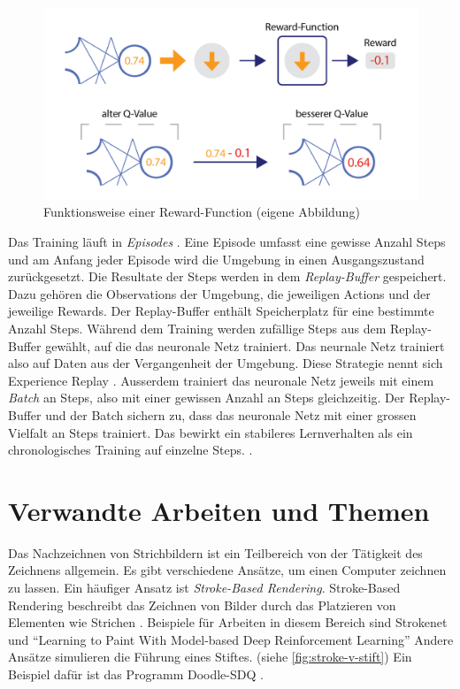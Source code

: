 \begin{figure}[!ht]
    \centering
    \includegraphics[width=\textwidth]{images/theorie/reinforce-2.png}
    \caption{Funktionsweise einer Reward-Function (eigene Abbildung)}
    \label{fig:reinforce-2}
\end{figure}

Das Training läuft in \emph{Episodes} \cite[S. 14]{sutton_reinforcement_2014}.
Eine Episode umfasst eine gewisse Anzahl Steps und am Anfang jeder Episode wird
die Umgebung in einen Ausgangszustand zurückgesetzt. Die Resultate der Steps
werden in dem \emph{Replay-Buffer} gespeichert. Dazu gehören die Observations
der Umgebung, die jeweiligen Actions und der jeweilige Rewards. Der
Replay-Buffer enthält Speicherplatz für eine bestimmte Anzahl Steps. Während dem
Training werden zufällige Steps aus dem Replay-Buffer gewählt, auf die das
neuronale Netz trainiert. Das neurnale Netz trainiert also auf Daten aus der
Vergangenheit der Umgebung. Diese Strategie nennt sich Experience Replay
\cite[S. 5]{mnih_playing_2013}. Ausserdem trainiert das neuronale Netz jeweils
mit einem \emph{Batch} an Steps, also mit einer gewissen Anzahl an Steps
gleichzeitig. Der Replay-Buffer und der Batch sichern zu, dass das neuronale
Netz mit einer grossen Vielfalt an Steps trainiert. Das bewirkt ein stabileres
Lernverhalten als ein chronologisches Training auf einzelne Steps.
\cite{phd_how_2021}.


\section{Verwandte Arbeiten und Themen}\label{chap:t_ver} Das Nachzeichnen von
Strichbildern ist ein Teilbereich von der Tätigkeit des Zeichnens allgemein. Es
gibt verschiedene Ansätze, um einen Computer zeichnen zu lassen. Ein häufiger
Ansatz ist \emph{Stroke-Based Rendering}. Stroke-Based Rendering beschreibt das
Zeichnen von Bilder durch das Platzieren von Elementen wie Strichen
\cite{hertzmann_stroke_2002}. Beispiele für Arbeiten in diesem Bereich sind
Strokenet \cite{zheng2018strokenet} und ``Learning to Paint With Model-based
Deep Reinforcement Learning'' \cite{huang_learning_2019} Andere Ansätze
simulieren die Führung eines Stiftes. (siehe \autoref{fig:stroke-v-stift}) Ein
Beispiel dafür ist das Programm Doodle-SDQ \cite{zhou_learning_2018}.

